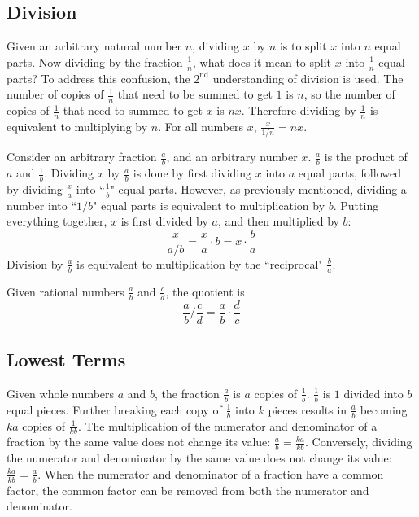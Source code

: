 \documentclass{article}
\begin{document}
\subsection{Division}

Given an arbitrary natural number \(n\), dividing \(x\) by \(n\) is to split \(x\) into \(n\) equal parts. Now dividing by the fraction \(\frac{1}{n}\), what does it mean to split \(x\) into \(\frac{1}{n}\) equal parts? To address this confusion, the \(2^\text{nd}\) understanding of division is used. The number of copies of \(\frac{1}{n}\) that need to be summed to get \(1\) is \(n\), so the number of copies of \(\frac{1}{n}\) that need to summed to get \(x\) is \(n x\). Therefore dividing by \(\frac{1}{n}\) is equivalent to multiplying by \(n\). For all numbers \(x\), \(\frac{x}{1/n} = nx\). 

Consider an arbitrary fraction \(\frac{a}{b}\), and an arbitrary number \(x\). \(\frac{a}{b}\) is the product of \(a\) and \(\frac{1}{b}\). Dividing \(x\) by \(\frac{a}{b}\) is done by first dividing \(x\) into \(a\) equal parts, followed by dividing \(\frac{x}{a}\) into ``\(\frac{1}{b}\)" equal parts. However, as previously mentioned, dividing a number into ``\(1/b\)" equal parts is equivalent to multiplication by \(b\). Putting everything together, \(x\) is first divided by \(a\), and then multiplied by \(b\): 
\[\frac{x}{a/b} = \frac{x}{a} \cdot b = x \cdot \frac{b}{a}\]   
Division by \(\frac{a}{b}\) is equivalent to multiplication by the ``reciprocal" \(\frac{b}{a}\).

Given rational numbers \(\frac{a}{b}\) and \(\frac{c}{d}\), the quotient is 
\[\frac{a}{b} \Big/ \frac{c}{d} = \frac{a}{b} \cdot \frac{d}{c}\]


\subsection{Lowest Terms}

Given whole numbers \(a\) and \(b\), the fraction \(\frac{a}{b}\) is \(a\) copies of \(\frac{1}{b}\). \(\frac{1}{b}\) is \(1\) divided into \(b\) equal pieces. Further breaking each copy of \(\frac{1}{b}\) into \(k\) pieces results in \(\frac{a}{b}\) becoming \(ka\) copies of \(\frac{1}{kb}\). The multiplication of the numerator and denominator of a fraction by the same value does not change its value: \(\frac{a}{b} = \frac{k a}{k b}\). Conversely, dividing the numerator and denominator by the same value does not change its value: \(\frac{k a}{k b} = \frac{a}{b}\). When the numerator and denominator of a fraction have a common factor, the common factor can be removed from both the numerator and denominator. 
\end{document}
